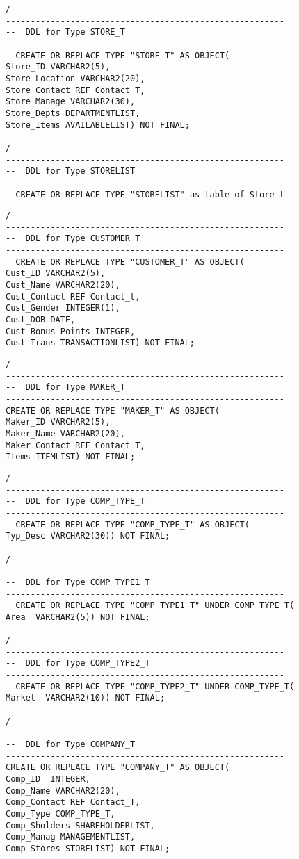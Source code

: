 \documentclass{scrartcl}
\begin{document}
\begin{lstlisting}
/
--------------------------------------------------------
--  DDL for Type STORE_T
--------------------------------------------------------
  CREATE OR REPLACE TYPE "STORE_T" AS OBJECT(
Store_ID VARCHAR2(5),
Store_Location VARCHAR2(20),
Store_Contact REF Contact_T,
Store_Manage VARCHAR2(30),
Store_Depts DEPARTMENTLIST,
Store_Items AVAILABLELIST) NOT FINAL;

/
--------------------------------------------------------
--  DDL for Type STORELIST
--------------------------------------------------------
  CREATE OR REPLACE TYPE "STORELIST" as table of Store_t
\end{lstlisting}

\begin{lstlisting}
/
--------------------------------------------------------
--  DDL for Type CUSTOMER_T
--------------------------------------------------------
  CREATE OR REPLACE TYPE "CUSTOMER_T" AS OBJECT(
Cust_ID VARCHAR2(5),
Cust_Name VARCHAR2(20),
Cust_Contact REF Contact_t,
Cust_Gender INTEGER(1),
Cust_DOB DATE,
Cust_Bonus_Points INTEGER,
Cust_Trans TRANSACTIONLIST) NOT FINAL; 
\end{lstlisting}

\begin{lstlisting}
/
--------------------------------------------------------
--  DDL for Type MAKER_T
--------------------------------------------------------
CREATE OR REPLACE TYPE "MAKER_T" AS OBJECT(
Maker_ID VARCHAR2(5),
Maker_Name VARCHAR2(20),
Maker_Contact REF Contact_T,
Items ITEMLIST) NOT FINAL;  
\end{lstlisting}

\begin{lstlisting}
/
--------------------------------------------------------
--  DDL for Type COMP_TYPE_T
--------------------------------------------------------
  CREATE OR REPLACE TYPE "COMP_TYPE_T" AS OBJECT(
Typ_Desc VARCHAR2(30)) NOT FINAL;

/
--------------------------------------------------------
--  DDL for Type COMP_TYPE1_T
--------------------------------------------------------
  CREATE OR REPLACE TYPE "COMP_TYPE1_T" UNDER COMP_TYPE_T(
Area  VARCHAR2(5)) NOT FINAL;

/
--------------------------------------------------------
--  DDL for Type COMP_TYPE2_T
--------------------------------------------------------
  CREATE OR REPLACE TYPE "COMP_TYPE2_T" UNDER COMP_TYPE_T(
Market  VARCHAR2(10)) NOT FINAL;
  
/
--------------------------------------------------------
--  DDL for Type COMPANY_T
--------------------------------------------------------
CREATE OR REPLACE TYPE "COMPANY_T" AS OBJECT(
Comp_ID  INTEGER,
Comp_Name VARCHAR2(20),
Comp_Contact REF Contact_T,
Comp_Type COMP_TYPE_T,
Comp_Sholders SHAREHOLDERLIST,
Comp_Manag MANAGEMENTLIST,
Comp_Stores STORELIST) NOT FINAL;
\end{lstlisting}
		
\end{document}
